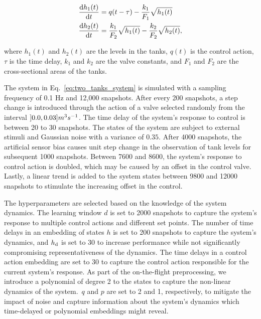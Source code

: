 \begin{equation}\label{eq:two_tanks_system}
    \begin{aligned}
        \diff{h_1(t)}{t} & = q(t-\tau) - \frac{k_1}{F_1}\sqrt{h_1(t)}                     \\
        \diff{h_2(t)}{t} & = \frac{k_1}{F_2}\sqrt{h_1(t)} - \frac{k_2}{F_2}\sqrt{h_2(t)},
    \end{aligned}
\end{equation}

where \(h_1(t)\) and \(h_2(t)\) are the levels in the tanks, \(q(t)\) is the control action, \(\tau \) is the time delay, \(k_1\) and \(k_2\) are the valve constants, and \(F_1\) and \(F_2\) are the cross-sectional areas of the tanks.

The system in Eq.~\ref{eq:two_tanks_system} is simulated with a sampling frequency of 0.1 Hz and 12,000 snapshots. After every 200 snapshots, a step change is introduced through the action of a valve selected randomly from the interval \(\interval[open left]{0.0}{0.03} m^3s^{-1}\). The time delay of the system's response to control is between 20 to 30 snapshots. The states of the system are subject to external stimuli and Gaussian noise with a variance of \(0.35\). After 4000 snapshots, the artificial sensor bias causes unit step change in the observation of tank levels for subsequent 1000 snapshots. Between 7600 and 8600, the system's response to control action is doubled, which may be caused by an offset in the control valve. Lastly, a linear trend is added to the system states between 9800 and 12000 snapshots to stimulate the increasing offset in the control.

The hyperparameters are selected based on the knowledge of the system dynamics. The learning window \(d\) is set to 2000 snapshots to capture the system's response to multiple control actions and different set points. The number of time delays in an embedding of states \(h\) is set to 200 snapshots to capture the system's dynamics, and \(h _{\text{d}}\) is set to 30 to increase performance while not significantly compromising representativeness of the dynamics. The time delays in a control action embedding are set to 30 to capture the control action responsible for the current system's response. As part of the on-the-flight preprocessing, we introduce a polynomial of degree 2 to the states to capture the non-linear dynamics of the system.~\(q\) and \(p\) are set to 2 and 1, respectively, to mitigate the impact of noise and capture information about the system's dynamics which time-delayed or polynomial embeddings might reveal.

